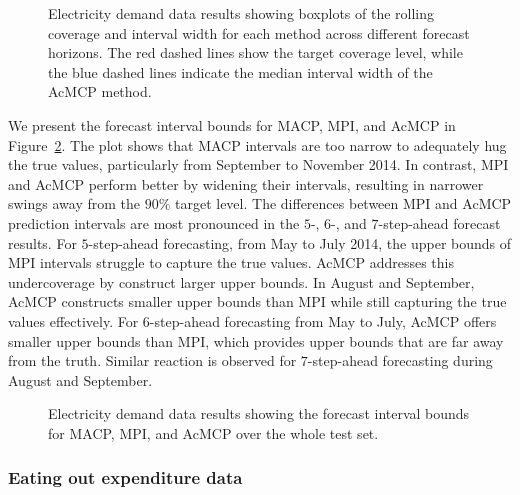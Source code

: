 \documentclass[
  11pt,
  a4paper,
]{article}
\theoremstyle{plain}
\theoremstyle{remark}
\begin{document}
\begin{figure}


\caption{\label{fig-elec_box}Electricity demand data results showing
boxplots of the rolling coverage and interval width for each method
across different forecast horizons. The red dashed lines show the target
coverage level, while the blue dashed lines indicate the median interval
width of the AcMCP method.}

\end{figure}%

We present the forecast interval bounds for MACP, MPI, and AcMCP in
Figure~\ref{fig-elec_timeplot}. The plot shows that MACP intervals are
too narrow to adequately hug the true values, particularly from
September to November 2014. In contrast, MPI and AcMCP perform better by
widening their intervals, resulting in narrower swings away from the
\(90\%\) target level. The differences between MPI and AcMCP prediction
intervals are most pronounced in the \(5\)-, \(6\)-, and
\(7\)-step-ahead forecast results. For \(5\)-step-ahead forecasting,
from May to July 2014, the upper bounds of MPI intervals struggle to
capture the true values. AcMCP addresses this undercoverage by construct
larger upper bounds. In August and September, AcMCP constructs smaller
upper bounds than MPI while still capturing the true values effectively.
For \(6\)-step-ahead forecasting from May to July, AcMCP offers smaller
upper bounds than MPI, which provides upper bounds that are far away
from the truth. Similar reaction is observed for \(7\)-step-ahead
forecasting during August and September.

\begin{figure}


\caption{\label{fig-elec_timeplot}Electricity demand data results
showing the forecast interval bounds for MACP, MPI, and AcMCP over the
whole test set.}

\end{figure}%

\subsubsection{Eating out expenditure
data}\label{eating-out-expenditure-data}
\end{document}

